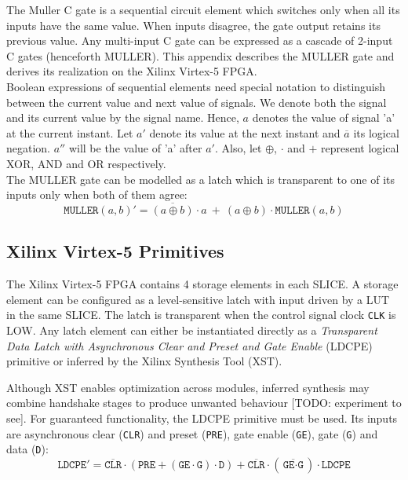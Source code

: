 The Muller C gate is a sequential circuit element which switches only when all its inputs have
the same value.
When inputs disagree, the gate output retains its previous value.
Any multi-input C gate can be expressed as a cascade of 2-input C gates
(henceforth MULLER).
This appendix describes the MULLER gate and derives its realization on 
the Xilinx Virtex-5 FPGA.
\\

Boolean expressions of sequential elements need special notation to distinguish
between the current value and next value of signals. 
We denote both the signal and its current value by the signal name. 
Hence, $a$ denotes the value of signal 'a' at the current instant. 
Let $a'$ denote its value at the next instant and $\overline{a}$ its
logical negation. $a''$ will be the value of 'a' after $a'$.
Also, let $\oplus$, $\cdot$ and $+$ represent logical XOR, AND and OR respectively.
\\

The MULLER gate can be modelled as a latch which is transparent to one of its
inputs only when both of them agree:
\begin{equation} \label{eq:muller_c}
	\texttt{MULLER}(a,b)' = 
	\overline{(a \oplus b)} \cdot a\ +\ (a \oplus b) \cdot \texttt{MULLER}(a,b)
\end{equation}

\subsection{Xilinx Virtex-5 Primitives}

The Xilinx Virtex-5 FPGA contains 4 storage elements in each SLICE.
A storage element can be configured as a level-sensitive latch with input
driven by a LUT in the same SLICE. 
The latch is transparent when the control signal clock \texttt{CLK} is LOW. 
Any latch element can either be instantiated directly as a 
\textsl{Transparent Data Latch with Asynchronous Clear and Preset and Gate
Enable} (LDCPE) primitive or inferred by the Xilinx Synthesis Tool (XST).

Although XST enables optimization across modules, inferred synthesis may 
combine handshake stages to produce unwanted behaviour [TODO: experiment to
see].
For guaranteed functionality, the LDCPE primitive must be used. 
Its inputs are asynchronous clear (\texttt{CLR}) and preset
(\texttt{PRE}), gate enable (\texttt{GE}), gate (\texttt{G}) and data
(\texttt{D}):
\begin{equation}\label{eq:virtex_latch}
	\texttt{LDCPE}' = \overline{\texttt{CLR}} \cdot 
	(\texttt{PRE} + (\texttt{GE} \cdot \texttt{G}) \cdot \texttt{D}) +
	\overline{\texttt{CLR}} \cdot 
	(\overline{\texttt{GE} \cdot \texttt{G}}) \cdot \texttt{LDCPE}
\end{equation}

